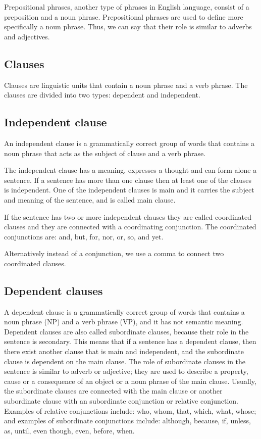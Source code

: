 \vspace{4mm}

Prepositional phrases, another type of phrases in English language, consist of a preposition and a noun phrase. Prepositional phrases are used to define more specifically a noun phrase. Thus, we can say that their role is similar to adverbs and adjectives.

\subsection{Clauses}

Clauses are linguistic units that contain a noun phrase and a verb phrase. The clauses are divided into two types: dependent and independent.

\subsection{Independent clause}

An independent clause is a grammatically correct group of words that contains a noun phrase that acts as the subject of clause and a verb phrase.

The independent clause has a meaning, expresses a thought and can form alone a sentence. If a sentence has more than one clause then at least one of the clauses is independent. One of the independent clauses is main and it carries the subject and meaning of the sentence, and is called main clause.

If the sentence has two or more independent clauses they are called coordinated clauses and they are connected with a coordinating conjunction. The coordinated conjunctions are: and, but, for, nor, or, so, and yet.

Alternatively instead of a conjunction, we use a comma to connect two coordinated clauses.

\subsection{Dependent clauses}

A dependent clause is a grammatically correct group of words that contains a noun phrase (NP) and a verb phrase (VP), and it has not semantic meaning. Dependent clauses are also called subordinate clauses, because their role in the sentence is secondary. This means that if a sentence has a dependent clause, then there exist another clause that is main and independent, and the subordinate clause is dependent on the main clause. The role of subordinate clauses in the sentence is similar to adverb or adjective; they are used to describe a property, cause or a consequence of an object or a noun phrase of the main clause. Usually, the subordinate clauses are connected with the main clause or another subordinate clause with an subordinate conjunction or relative conjunction. Examples of relative conjunctions include: who, whom, that, which, what, whose; and examples of subordinate conjunctions include: although, because, if, unless, as, until, even though, even, before, when.

